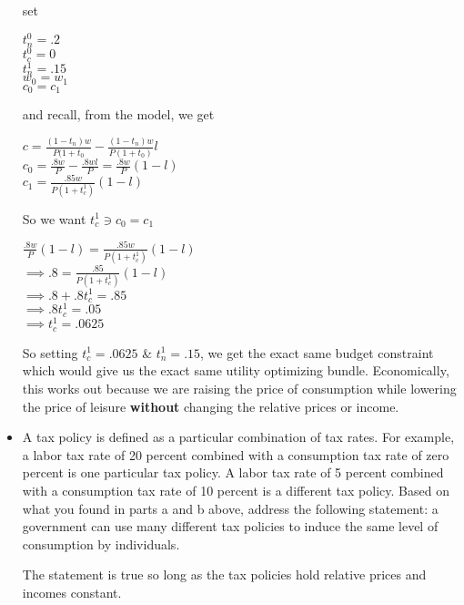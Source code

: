 \documentclass[11pt]{SelfArxOneColBMN}
\begin{document}
\begin{exercise}
\begin{itemize}
        \begin{solution}
                set
		\begin{center}
			$t_n^0 = .2$\\
			$t_c^0 = 0$\\
			$t_n^1 = .15$\\
			$w_0 = w_1$\\
			$c_0 = c_1$\\
		\end{center}
		and recall, from the model, we get
		\begin{center}
			$c = \frac{(1 - t_n)w}{P(1 + t_0} - \frac{(1 - t_n)w}{P(1 + t_0)}l$\\
			$c_0 = \frac{.8w}{P} - \frac{.8wl}{P} = \frac{.8w}{P}(1 - l)$\\
			$c_1 = \frac{.85w}{P(1 + t_c^1)}(1 - l)$
		\end{center}
		So we want $t_c^1 \ni c_0 = c_1$
		\begin{center}
			$\frac{.8w}{P}(1 - l) = \frac{.85w}{P(1 + t_c^1)}(1 - l)$\\
			$\implies .8 = \frac{.85}{P(1 + t_c^1)}(1 - l)$\\
			$\implies .8 + .8t_c^1 = .85$\\
			$\implies .8t_c^1 = .05$\\
			$\implies t_c^1 = .0625$
		\end{center}
		So setting $t_c^1 = .0625$ \& $t_n^1 = .15$, we get the exact same budget constraint which would give us the exact same utility optimizing bundle. Economically, this works out because we are raising the price of consumption while lowering the price of leisure \textbf{without} changing the relative prices or income.
        \end{solution}


\item A tax policy is defined as a particular combination of tax rates. For example, a labor tax rate of 20 percent combined with a consumption tax rate of zero percent is one particular tax policy. A labor tax rate of 5 percent combined with a consumption tax rate of 10 percent is a different tax policy. Based on what you found in parts a and b above, address the following statement: a government can use many different tax policies to induce the same level of consumption by individuals.

        \begin{solution}
                The statement is true so long as the tax policies hold relative prices and incomes constant. 
        \end{solution}



\end{itemize}
\end{exercise}
\end{document}

